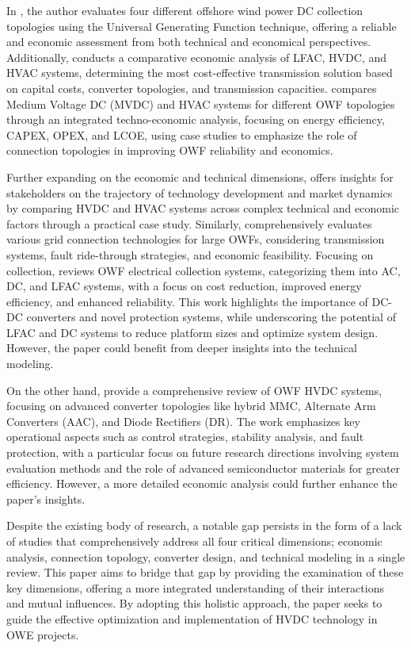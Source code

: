 \documentclass{ieeeaccess}
\begin{document}
In \cite{sun2021reliability}, the author evaluates four different offshore wind power DC collection topologies using the Universal Generating Function technique, offering a reliable and economic assessment from both technical and economical perspectives. Additionally, \cite{meng2021comparative} conducts a comparative economic analysis of LFAC, HVDC, and HVAC systems, determining the most cost-effective transmission solution based on capital costs, converter topologies, and transmission capacities. \cite{saraswati2022offshore} compares Medium Voltage DC (MVDC) and HVAC systems for different OWF topologies through an integrated techno-economic analysis, focusing on energy efficiency, CAPEX, OPEX, and LCOE, using case studies to emphasize the role of connection topologies in improving OWF reliability and economics.

Further expanding on the economic and technical dimensions, \cite{alassi2019hvdc} offers insights for stakeholders on the trajectory of technology development and market dynamics by comparing HVDC and HVAC systems across complex technical and economic factors through a practical case study. Similarly, \cite{yang2022critical} comprehensively evaluates various grid connection technologies for large OWFs, considering transmission systems, fault ride-through strategies, and economic feasibility. Focusing on collection, \cite{lakshmanan2021electrical} reviews OWF electrical collection systems, categorizing them into AC, DC, and LFAC systems, with a focus on cost reduction, improved energy efficiency, and enhanced reliability. This work highlights the importance of DC-DC converters and novel protection systems, while underscoring the potential of LFAC and DC systems to reduce platform sizes and optimize system design. However, the paper could benefit from deeper insights into the technical modeling.

On the other hand, \cite{deng2023review} provide a comprehensive review of OWF HVDC systems, focusing on advanced converter topologies like hybrid MMC, Alternate Arm Converters (AAC), and Diode Rectifiers (DR). The work emphasizes key operational aspects such as control strategies, stability analysis, and fault protection, with a particular focus on future research directions involving system evaluation methods and the role of advanced semiconductor materials for greater efficiency. However, a more detailed economic analysis could further enhance the paper's insights.

Despite the existing body of research, a notable gap persists in the form of a lack of studies that comprehensively address all four critical dimensions; economic analysis, connection topology, converter design, and technical modeling in a single review. This paper aims to bridge that gap by providing the examination of these key dimensions, offering a more integrated understanding of their interactions and mutual influences. By adopting this holistic approach, the paper seeks to guide the effective optimization and implementation of HVDC technology in OWE projects.
\end{document}

